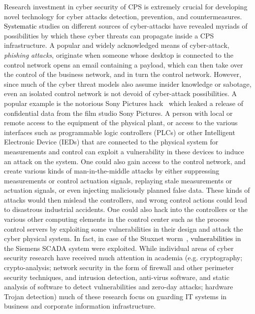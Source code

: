 Research investment in cyber security of CPS is 
extremely crucial for developing novel technology for cyber attacks detection, prevention, and countermeasures. \textcolor{black} {Systematic} studies on different sources of cyber-attacks have revealed myriads of possibilities by which these cyber threats can 
propagate inside a CPS infrastructure. A popular and widely acknowledged means of cyber-attack, {\em phishing attacks}, originate when someone whose desktop
is connected to the control network opens an email containing a payload, which can then
take over the control of the business network, and in turn the control network. However, since
much of the cyber threat models also assume insider knowledge or sabotage, even an isolated
control network is not devoid of cyber-attack possibilities. A popular example  is the notorious Sony Pictures hack~\cite{SonyHack2014} which leaked a release of confidential data from the film studio Sony Pictures. A person with local or remote access
to the equipment of the physical plant, or access to the various interfaces such as programmable
logic controllers (PLCs) or other Intelligent Electronic Device (IEDs) that are connected to the
physical system for measurements and control can exploit a vulnerability in these devices to
induce an attack on the system. One could also gain access to the control network, and create
various kinds of man-in-the-middle attacks by either suppressing measurements or control
actuation signals, replaying stale measurements or actuation signals, or even injecting
maliciously planned false data. These kinds of attacks would then mislead the controllers, and
wrong control actions could lead to disastrous industrial accidents. One could also hack into the
controllers or the various other computing elements in the control center such as the process control servers by
exploiting some vulnerabilities in their design and attack the cyber physical system. In fact, in
case of the Stuxnet worm~\cite{stuxnet}, \textcolor{black} {vulnerabilities} in the Siemens SCADA system were exploited. While individual areas of cyber security research have received
much attention in academia (e.g. cryptography; crypto-analysis; network
security in the form of firewall and other perimeter security techniques, and intrusion detection, anti-virus software, and static analysis of software to detect vulnerabilities and zero-day attacks;
hardware Trojan detection) much of these research focus on guarding IT systems in business and corporate information infrastructure. 

